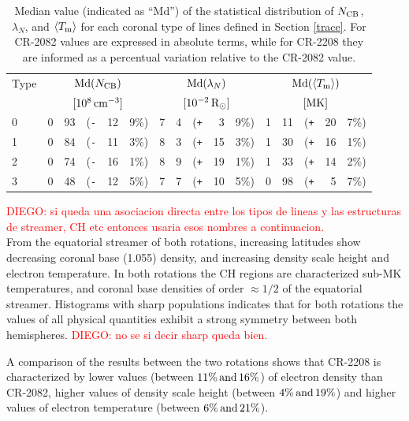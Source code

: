 \documentclass[namedreferences]{solarphysics}
\newcommand{\mrsun}{{\rm R_\odot}}
\newcommand{\med}{{\rm Md}}
\newcommand{\avgTe}{\left<\Tm\right>}
\newcommand{\MK}{{\rm MK}}
\newcommand{\lN}{\lambda_N}
\newcommand{\NCB}{N_{\rm CB}}
\newcommand{\aTm}{\left<\Tm\right>}
\newcommand{\Tm}{T_{\rm m}}
\newcommand{\Pl}{\texttt{+}}
\newcommand{\Mi}{\texttt{-}}
\def\diego#1{\textcolor{red}{DIEGO: #1}}
\def\temp#1{\textcolor{mygray}{#1}}
\begin{document}
\begin{article}
\begin{table}
\begin{tabular}{l r@{.}l@{\hskip 0.05in} r@{\hskip 0.01in} r@{.}l  r@{.}l@{\hskip 0.05in} r@{\hskip 0.01in} r@{.}l r@{.}l@{\hskip 0.05in} r@{\hskip 0.01in} r@{.}l }
\hline
Type    & \multicolumn{5}{c}{$\med(\NCB)$}             & \multicolumn{5}{c}{$\med(\lN)$} & \multicolumn{5}{c}{$\med(\avgTe)$} \\
       & \multicolumn{5}{c}{$[10^8\,{\rm cm}^{-3}]$}  & \multicolumn{5}{c}{$[{\rm 10}^{-2}\,\mrsun]$} & \multicolumn{5}{c}{$[\MK]$} \\
\hline
0  & 0&93 &(\Mi&12&9\%)  &   7&4 &(\Pl&~3&9\%) &   1&11 &(\Pl&20&7\%) \\
1  & 0&84 &(\Mi&11&3\%)  &   8&3 &(\Pl&15&3\%) &   1&30 &(\Pl&16&1\%) \\
2  & 0&74 &(\Mi&16&1\%)  &   8&9 &(\Pl&19&1\%) &   1&33 &(\Pl&14&2\%) \\
3  & 0&48 &(\Mi&12&5\%)  &   7&7 &(\Pl&10&5\%) &   0&98 &(\Pl&~5&7\%) \\
\hline          
\end{tabular}
\caption{Median value (indicated as ``Md'') of the statistical distribution of $\NCB$, $\lN$, and $\aTm$ for each coronal type of lines defined in Section \ref{trace}. For CR-2082 values are expressed in absolute terms, while for CR-2208 they are informed as a percentual variation relative to the CR-2082 value.}
\label{tabla_demt}
\end{table}

\diego{si queda una asociacion directa entre los tipos de lineas y las estructuras de streamer, CH etc entonces usaria esos nombres a continuacion.}\\
From the equatorial streamer of both rotations, increasing latitudes show decreasing \temp{coronal base (1.055)} density, and increasing density scale height and electron temperature. In both rotations the CH regions are characterized sub-MK temperatures, and coronal base densities of order $\approx 1/2$ of the equatorial streamer. Histograms with sharp populations indicates that for both rotations the values of all physical quantities exhibit a strong symmetry between both hemispheres. \diego{no se si decir sharp queda bien.}


A comparison of the results between the two rotations shows that CR-2208 is characterized by lower values (between $11\%\, \rm and\, 16\%$) of electron density than CR-2082, higher values of density scale height (between $4\%\, \rm and\,19\%$) and higher values of electron temperature (between $6\%\, \rm and\,21\%$).


\end{article}
\end{document}
